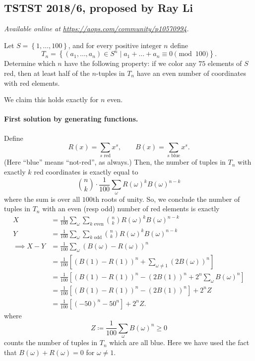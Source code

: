\documentclass[11pt]{scrartcl}
\begin{document}
\subsection{TSTST 2018/6, proposed by Ray Li}
\textsl{Available online at \url{https://aops.com/community/p10570994}.}
\begin{mdframed}[style=mdpurplebox,frametitle={Problem statement}]
Let $S = \left\{ 1, \dots, 100 \right\}$,
and for every positive integer $n$ define
\[
  T_n = \left\{ (a_1, \dots, a_n) \in S^n
    \mid a_1 + \dots + a_n \equiv 0 \pmod{100} \right\}.
\]
Determine which $n$ have the following property:
if we color any $75$ elements of $S$ red,
then at least half of the $n$-tuples in $T_n$
have an even number of coordinates with red elements.
\end{mdframed}
We claim this holds exactly for $n$ even.

\paragraph{First solution by generating functions.}
Define
\[
  R(x) = \sum_{s \text{ red}} x^s, \qquad
  B(x) = \sum_{s \text{ blue}} x^s.
\]
(Here ``blue'' means ``not-red'', as always.)
Then, the number of tuples in $T_n$ with exactly
$k$ red coordinates is exactly equal to
\[ \binom nk \cdot \frac 1{100} \sum_{\omega} R(\omega)^k B(\omega)^{n-k} \]
where the sum is over all $100$th roots of unity.
So, we conclude the number of tuples in $T_n$
with an even (resp odd) number of red elements is exactly
\begin{align*}
  X &= \frac1{100} \sum_{\omega} \sum_{k \text{ even}}
    \binom nk R(\omega)^k B(\omega)^{n-k} \\
  Y &= \frac1{100} \sum_{\omega} \sum_{k \text{ odd}}
    \binom nk R(\omega)^k B(\omega)^{n-k} \\
  \implies X-Y &= \frac 1{100} \sum_{\omega}
    \left( B(\omega)-R(\omega) \right)^n \\
  &= \frac 1{100} \left[
     \left( B(1)-R(1) \right)^n
     + \sum_{\omega \neq 1} (2B(\omega))^n \right] \\
  &= \frac 1{100} \left[ \left( B(1)-R(1) \right)^n - (2B(1))^n
    + 2^n \sum_{\omega} B(\omega)^n \right] \\
  &= \frac 1{100} \left[ \left( B(1)-R(1) \right)^n - (2B(1))^n \right]
    + 2^n Z \\
  &= \frac 1{100} \left[ \left( -50 \right)^n - 50^n \right] + 2^n Z.
\end{align*}
where
\[ Z \coloneqq \frac 1{100} \sum_{\omega} B(\omega)^n \ge 0 \]
counts the number of tuples in $T_n$ which are all blue.
Here we have used the fact that $B(\omega)+R(\omega)=0$
for $\omega \neq 1$.
\end{document}
